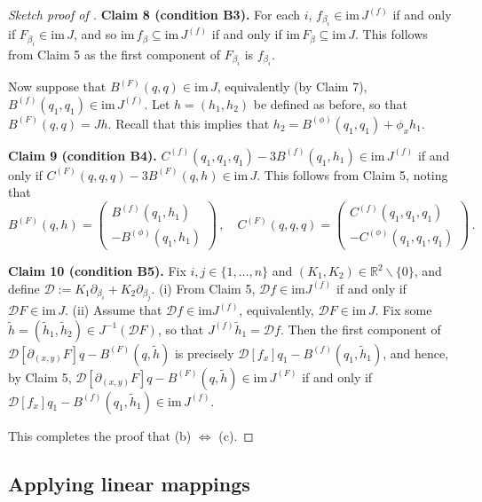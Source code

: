 \documentclass[11pt]{amsart}
\newcommand{\R}{\mathbb{R}}
\newcommand{\mD}{\mathcal{D}}
\theoremstyle{definition}
\begin{document}
\begin{proof}[Sketch proof of ]
{\bf Claim 8 (condition B3).} For each $i$, $f_{\beta_i} \in \mathrm{im}\,J^{(f)}$ if and only if $F_{\beta_i} \in \mathrm{im}\,J$, and so $\mathrm{im}\,f_\beta \subseteq \mathrm{im}\,J^{(f)}$ if and only if $\mathrm{im}\,F_\beta \subseteq \mathrm{im}\,J$. This follows from Claim 5 as the first component of $F_{\beta_i}$ is $f_{\beta_i}$.

Now suppose that $B^{(F)}(q,q) \in \mathrm{im}\,J$, equivalently (by Claim 7), $B^{(f)}(q_1,q_1) \in \mathrm{im}\,J^{(f)}$. Let $h = (h_1, h_2)$ be defined as before, so that  $B^{(F)}(q,q) = Jh$. Recall that this implies that $h_2 = B^{(\phi)}(q_1, q_1) + \phi_x h_1$. 

{\bf Claim 9 (condition B4).} $C^{(f)}(q_1,q_1,q_1) - 3B^{(f)}(q_1,h_1) \in \mathrm{im}\,J^{(f)}$ if and only if $C^{(F)}(q,q,q) - 3B^{(F)}(q,h) \in \mathrm{im}\,J$. This follows from Claim 5, noting that
\[
B^{(F)}(q,h) = \left(\begin{array}{c}B^{(f)}(q_1,h_1)\\-B^{(\phi)}(q_1, h_1)\end{array}\right)\,, \quad C^{(F)}(q,q,q) = \left(\begin{array}{c}C^{(f)}(q_1,q_1,q_1)\\-C^{(\phi)}(q_1,q_1,q_1)\end{array}\right)\,.
\]


{\bf Claim 10 (condition B5).} Fix $i,j \in \{1, \ldots, n\}$ and $(K_1, K_2) \in \R^2\backslash\{0\}$, and define $\mD:= K_1 \partial_{\beta_i}+ K_2 \partial_{\beta_j}$. (i) From Claim 5, $\mD f \in \mathrm{im} J^{(f)}$ if and only if $\mD F \in \mathrm{im}\,J$. (ii) Assume that $\mD f \in \mathrm{im} J^{(f)}$, equivalently, $\mD F \in \mathrm{im}\,J$. Fix some $\tilde{h} = (\tilde{h}_1, \tilde{h}_2) \in J^{-1}(\mD F)$, so that $J^{(f)}\tilde{h}_1 = \mD f$. Then the first component of $\mD[\partial_{(x,y)}F]q - B^{(F)}(q, \tilde{h})$ is precisely $\mD[f_x]q_1 - B^{(f)}(q_1, \tilde{h}_1)$, and hence, by Claim 5, $\mD[\partial_{(x,y)}F]q - B^{(F)}(q, \tilde{h}) \in \mathrm{im}\,J^{(F)}$ if and only if $\mD[f_x]q_1 - B^{(f)}(q_1, \tilde{h}_1) \in \mathrm{im}\,J^{(f)}$.

This completes the proof that (b) $\Leftrightarrow$ (c). 
\end{proof}

\subsection{Applying linear mappings} 
\end{document}
